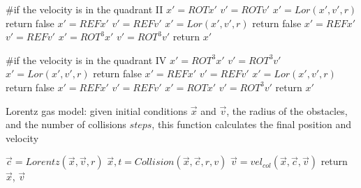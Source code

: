 \documentclass{iopart}
\begin{document}
\begin{algorithm}                     
\begin{algorithmic}                  

\State  \#if the velocity is in the quadrant II
\State        $x'=ROT x'$
\State        $v'=ROT v'$
\State            $x'=Lor(x',v',r) $
\State                return false
            \EndIf            
\State            $x'=REF x'$
\State            $v'=REF v'$
\State           $x'=Lor(x',v',r)$
\State                return false
            \EndIf            
\State            $x'=REF x'$  
\State            $v'=REF v'$ 
        \EndIf     
\State        $x'=ROT^3  x'$
\State        $v'=ROT^3  v'$
\State        return $x'$
    
\State  \#if the velocity is in the quadrant IV
\State        $x'=ROT^3  x'$
\State        $v'=ROT^3  v'$
\State            $x'=Lor(x',v',r)$  
\State                return false
            \EndIf                
\State            $x'=REF x'$
\State            $v'=REF v'$
\State            $x'=Lor(x',v',r)$
\State                return false
            \EndIf          
\State            $x'=REF x'$
\State            $v'=REF v' $
        \EndIf   
\State        $x'=ROT x'$
\State        $v'=ROT^3  v'$
\State        return $x'$
    \EndIf


\EndFunction
\end{algorithmic}
\end{algorithm}

\begin{algorithm}
\caption{Lorentz gas model: given initial conditions  $\vec{x}$ and $\vec{v}$, the radius of the obstacles, and the number of collisions $steps$, this function calculates the final position and velocity}
\label{LorentzGas}
\begin{algorithmic}
\State        $\vec{c}=Lorentz(\vec{x},\vec{v},r)$ 
\State        $\vec{x}, t=Collision(\vec{x},\vec{c},r,v)$
\State        $\vec{v}=vel_{col}(\vec{x},\vec{c},\vec{v})$
    \EndFor
\State    return $\vec{x}$, $\vec{v}$
\EndFunction 
\end{algorithmic}
\end{algorithm}
\end{document}
